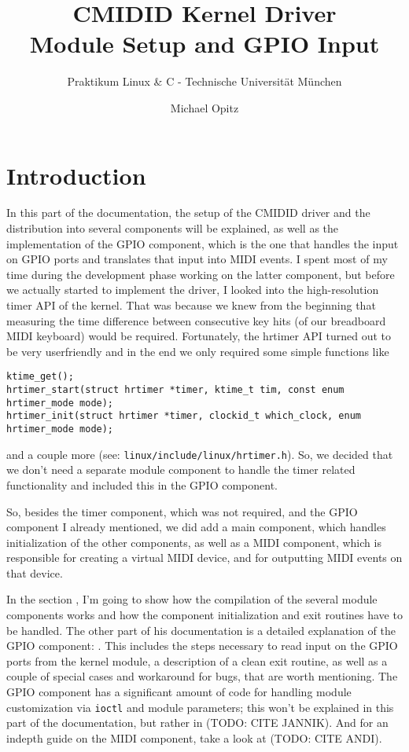 \documentclass[paper=a4,fontsize=11pt,twocolumn,pagesize,bibtotoc]{scrartcl}
\title{CMIDID Kernel Driver\\Module Setup and GPIO Input}
\subtitle{Praktikum Linux \& C - Technische Universität München}
\author{Michael Opitz}
\begin{document}
\maketitle

\section{Introduction}
\label{michael:introduction}

In this part of the documentation, the setup of the CMIDID driver and the 
distribution into several components will be explained, as well as the 
implementation of the GPIO component, which is the one that handles the input 
on GPIO ports and translates that input into MIDI events.
I spent most of my time during the 
development phase working on the latter component, but before we actually 
started to implement the driver, I looked into the high-resolution timer API 
of the kernel. That was because we knew from the beginning that measuring the 
time difference between consecutive key hits (of our breadboard MIDI keyboard) 
would be required. Fortunately, the hrtimer API turned out to be very 
userfriendly and in the end we only required some simple functions like 
\begin{lstlisting}
ktime_get();
hrtimer_start(struct hrtimer *timer, ktime_t tim, const enum hrtimer_mode mode);
hrtimer_init(struct hrtimer *timer, clockid_t which_clock, enum hrtimer_mode mode);
\end{lstlisting}
and a couple more (see: \texttt{linux/include/linux/hrtimer.h}).
So, we decided that we don't need a separate module 
component to handle the timer related functionality and included this in the 
GPIO component.

So, besides the timer component, which was not required, and the GPIO 
component I already mentioned, we did add a main component, which handles 
initialization of the other components, as well as a MIDI component, which is 
responsible for creating a virtual MIDI device, and for outputting MIDI 
events on that device.

In the section \textbf{}, I'm going to show how the compilation of 
the several module components works and how the component initialization and 
exit routines have to be handled. The other part of his documentation is 
a detailed explanation of the GPIO component: \textbf{}. This 
includes the steps necessary to read input on the GPIO ports from the kernel 
module, a description of a clean exit routine, as well as a couple of special 
cases and workaround for bugs, that are worth mentioning. The GPIO component 
has a significant amount of code for handling module customization via 
\texttt{ioctl} and module parameters; this won't be explained in this part of 
the documentation, but rather in (TODO: CITE JANNIK). And for an indepth guide 
on the MIDI component, take a look at (TODO: CITE ANDI).
\end{document}
